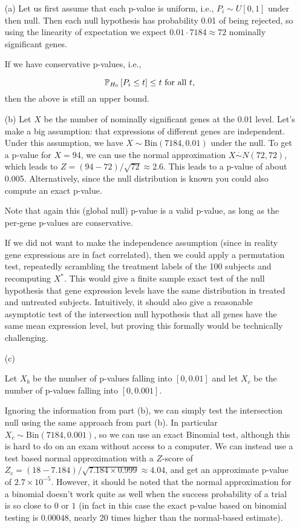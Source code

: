 \begin{enumerate}
\item[(a)] Let us first assume that each p-value is uniform, i.e., $P_i \sim U[0,1]$ under then null. Then each null hypothesis has probability 0.01 of being rejected, so using the linearity of expectation we expect $0.01\cdot 7184 \approx 72$ nominally significant genes.

If we have conservative p-values, i.e.,

\begin{equation}
\label{eq:conservative_pvalue}
\PP[H_0]{P_i \leq t} \leq t \text{ for all }t,
\end{equation}
then the above is still an upper bound.

\item[(b)] Let $X$ be the number of nominally significant genes at the 0.01 level. Let's make a big assumption: that expressions of different genes are independent. Under this assumption, we have $X \sim \text{Bin}(7184, 0.01)$ under the null. To get a p-value for $X = 94$, we can use the normal approximation $X \overset{\cdot}{\sim} N(72, 72)$, which leads to $Z = (94 - 72)/\sqrt{72} \approx 2.6$. This leads to a p-value of about 0.005. Alternatively, since the null distribution is known you could also compute an exact p-value.
		
Note that again this (global null) p-value is a valid p-value, as long as the per-gene p-values are conservative.

If we did not want to make the independence assumption (since in reality gene expressions are in fact correlated), then we could apply a permutation test, repeatedly scrambling the treatment labels of the 100 subjects and recomputing $X^*$. This would give a finite sample exact test of the null hypothesis that gene expression levels have the same distribution in treated and untreated subjects. Intuitively, it should also give a reasonable asymptotic test of the intersection null hypothesis that all genes have the same mean expression level, but proving this formally would be technically challenging.

\item[(c)] 


Let $X_b$ be the number of p-values falling into $[0,0.01]$ and let $X_c$ be the number of p-values falling into $[0,0.001]$. 

Ignoring the information from part (b), we can simply test the intersection null using the same approach from part (b). In particular $X_c \sim \text{Bin}(7184, 0.001)$, so we can use an exact Binomial test, although this is hard to do on an exam without access to a computer. We can instead use a test based normal approximation with a $Z$-score of $Z_c = (18 - 7.184)/\sqrt{7.184 \times 0.999} \approx 4.04$, and get an approximate p-value of $2.7 \times 10^{-5}$. However, it should be noted that the normal approximation for a binomial doesn't work quite as well when the success probability of a trial is so close to $0$ or $1$ (in fact in this case the exact p-value based on binomial testing is $0.00048$, nearly 20 times higher than the normal-based estimate).


\end{enumerate}
